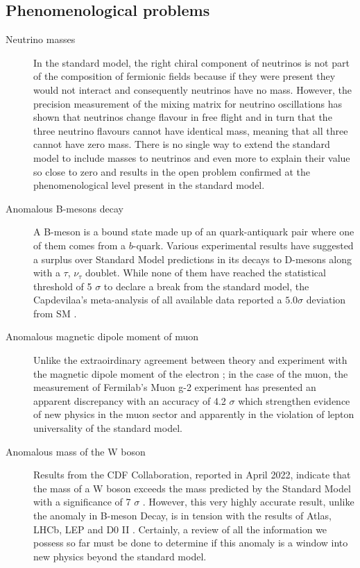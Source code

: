 \subsection{Phenomenological problems}\label{pheno_bsm}
\begin{description}
	\item[Neutrino masses] In the standard model, the right chiral component of neutrinos is not part of the composition of fermionic fields because if they were present they would not interact and consequently neutrinos have no mass. However, the precision measurement \cite{Abe_2008} of the mixing matrix for neutrino oscillations has shown that neutrinos change flavour in free flight and in turn that the three neutrino flavours cannot have identical mass, meaning that all three cannot have zero mass. There is no single way to extend the standard model to include masses to neutrinos and even more to explain their value so close to zero and results in the open problem confirmed at the phenomenological level present in the standard model.
	\item[Anomalous B-mesons decay] A B-meson is a bound state made up of an quark-antiquark pair where one of them comes from a $b$-quark. Various experimental results \cite{PhysRevLett.109.101802, PhysRevLett.115.111803,Altmannshofer_2015, Hurth_2016,arxiv.2103.11769} have suggested a surplus over Standard Model predictions in its decays to D-mesons along with a $\tau$, $\nu_\tau$ doublet. While none of them have reached the statistical threshold of 5 $\sigma$ to declare a break from the standard model, the Capdevilaa's meta-analysis of all available data reported a $5.0\sigma$ deviation from SM \cite{Capdevila_2018}. 
	\item[Anomalous magnetic dipole moment of muon]  Unlike the extraoirdinary agreement between theory and experiment with the magnetic dipole moment of the electron \cite{PhysRevLett.97.030801}; in the case of the muon, the measurement of Fermilab's Muon g-2 experiment has presented an apparent discrepancy  with an accuracy of 4.2 $\sigma$ \cite{arxiv.1311.2198, Abi_2021} which strengthen evidence of new physics in the muon sector and apparently in the violation of lepton universality of the standard model. 
	\item[Anomalous mass of the W boson] Results from the CDF Collaboration, reported in April 2022, indicate that the mass of a W boson exceeds the mass predicted by the Standard Model with a significance of 7 $\sigma$ \cite{abk1781}. However, this very highly accurate result, unlike the anomaly in B-meson Decay, is in tension with the results of Atlas, LHCb, LEP and D0 II \cite{Aaboud_2018,jhep012022036,Schael_2006,Abazov_2012,}. Certainly, a review of all the information we possess so far must be done to determine if this anomaly is a window into new physics beyond the standard model.

\end{description}
